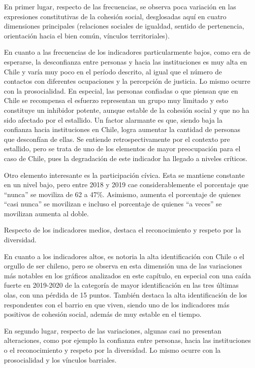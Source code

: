 \documentclass[
  12pt,
]{book}
\begin{document}
En primer lugar, respecto de las frecuencias, se observa poca variación en las expresiones constitutivas de la cohesión social, desglosadas aquí en cuatro dimensiones principales (relaciones sociales de igualdad, sentido de pertenencia, orientación hacia el bien común, vínculos territoriales).

En cuanto a las frecuencias de los indicadores particularmente bajos, como era de esperarse, la desconfianza entre personas y hacia las instituciones es muy alta en Chile y varía muy poco en el período descrito, al igual que el número de contactos con diferentes ocupaciones y la percepción de justicia. Lo mismo ocurre con la prosocialidad. En especial, las personas confiadas o que piensan que en Chile se recompensa el esfuerzo representan un grupo muy limitado y esto constituye un inhibidor potente, aunque estable de la cohesión social y que no ha sido afectado por el estallido. Un factor alarmante es que, siendo baja la confianza hacia instituciones en Chile, logra aumentar la cantidad de personas que desconfían de ellas. Se entiende retrospectivamente por el contexto pre estallido, pero se trata de uno de los elementos de mayor preocupación para el caso de Chile, pues la degradación de este indicador ha llegado a niveles críticos.

Otro elemento interesante es la participación cívica. Esta se mantiene constante en un nivel bajo, pero entre 2018 y 2019 cae considerablemente el porcentaje que ``nunca'' se moviliza de 62 a 47\%. Asimismo, aumenta el porcentaje de quienes ``casi nunca'' se movilizan e incluso el porcentaje de quienes ``a veces'' se movilizan aumenta al doble.

Respecto de los indicadores medios, destaca el reconocimiento y respeto por la diversidad.

En cuanto a los indicadores altos, es notoria la alta identificación con Chile o el orgullo de ser chileno, pero se observa en esta dimensión una de las variaciones más notables en los gráficos analizados en este capítulo, en especial con una caída fuerte en 2019-2020 de la categoría de mayor identificación en las tres últimas olas, con una pérdida de 15 puntos. También destaca la alta identificación de los respondentes con el barrio en que viven, siendo uno de los indicadores más positivos de cohesión social, además de muy estable en el tiempo.

En segundo lugar, respecto de las variaciones, algunas casi no presentan alteraciones, como por ejemplo la confianza entre personas, hacia las instituciones o el reconocimiento y respeto por la diversidad. Lo mismo ocurre con la prosocialidad y los vínculos barriales.
\end{document}
